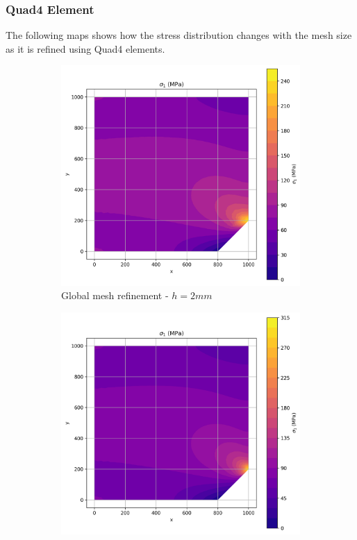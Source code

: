 \subsubsection{Quad4 Element}

The following maps shows how the stress distribution changes with the mesh size as it is refined using Quad4 elements.

\begin{figure}[H]
  \centering
  \begin{subfigure}[b]{0.45\textwidth}
    \centering
    \includegraphics[width=\textwidth]{GRAFICOS/Quad4/2mm_global/resultados - sigma_1.png}
    \caption{Global mesh refinement - $h=2mm$}
    \label{fig:img1}
  \end{subfigure}
  \hfill
  \begin{subfigure}[b]{0.45\textwidth}
    \centering
    \includegraphics[width=\textwidth]{GRAFICOS/Quad4/2mm_local/resultados - sigma_1.png}

\end{subfigure}
\end{figure}
